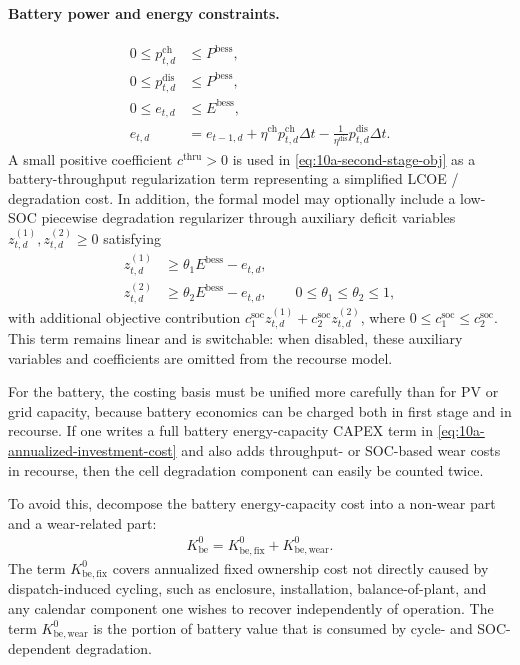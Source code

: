 \paragraph{Battery power and energy constraints.}
\begin{align}
0 \le p^{\mathrm{ch}}_{t,d} &\le P^{\mathrm{bess}},
\label{eq:10a-battery-charge-limit}\\
0 \le p^{\mathrm{dis}}_{t,d} &\le P^{\mathrm{bess}},
\label{eq:10a-battery-discharge-limit}\\
0 \le e_{t,d} &\le E^{\mathrm{bess}},
\label{eq:10a-battery-energy-limit}\\
e_{t,d} &= e_{t-1,d} + \eta^{\mathrm{ch}} p^{\mathrm{ch}}_{t,d}\Delta t - \frac{1}{\eta^{\mathrm{dis}}} p^{\mathrm{dis}}_{t,d}\Delta t.
\label{eq:10a-battery-dynamics}
\end{align}
A small positive coefficient \(c^{\mathrm{thru}}>0\) is used in \eqref{eq:10a-second-stage-obj} as a battery-throughput regularization term representing a simplified LCOE / degradation cost.
In addition, the formal model may optionally include a low-SOC piecewise degradation regularizer through auxiliary deficit variables \(z^{(1)}_{t,d}, z^{(2)}_{t,d} \ge 0\) satisfying
\begin{align}
z^{(1)}_{t,d} &\ge \theta_1 E^{\mathrm{bess}} - e_{t,d},\\
z^{(2)}_{t,d} &\ge \theta_2 E^{\mathrm{bess}} - e_{t,d}, \qquad 0 \le \theta_1 \le \theta_2 \le 1,
\label{eq:10a-piecewise-soc-epigraph}
\end{align}
with additional objective contribution \(c^{\mathrm{soc}}_1 z^{(1)}_{t,d} + c^{\mathrm{soc}}_2 z^{(2)}_{t,d}\), where \(0 \le c^{\mathrm{soc}}_1 \le c^{\mathrm{soc}}_2\). This term remains linear and is switchable: when disabled, these auxiliary variables and coefficients are omitted from the recourse model.

For the battery, the costing basis must be unified more carefully than for PV or grid capacity, because battery economics can be charged both in first stage and in recourse. If one writes a full battery energy-capacity CAPEX term in \eqref{eq:10a-annualized-investment-cost} and also adds throughput- or SOC-based wear costs in recourse, then the cell degradation component can easily be counted twice.

To avoid this, decompose the battery energy-capacity cost into a non-wear part and a wear-related part:
\begin{align}
K_{\mathrm{be}}^0 = K_{\mathrm{be,fix}}^0 + K_{\mathrm{be,wear}}^0.
\label{eq:10a-battery-capex-split}
\end{align}
The term \(K_{\mathrm{be,fix}}^0\) covers annualized fixed ownership cost not directly caused by dispatch-induced cycling, such as enclosure, installation, balance-of-plant, and any calendar component one wishes to recover independently of operation. The term \(K_{\mathrm{be,wear}}^0\) is the portion of battery value that is consumed by cycle- and SOC-dependent degradation.

